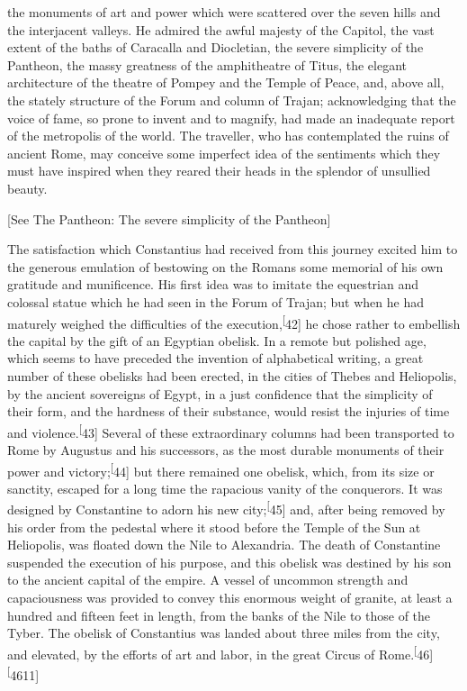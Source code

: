 the monuments of art and power which were scattered over the
seven hills and the interjacent valleys. He admired the awful
majesty of the Capitol, the vast extent of the baths of Caracalla
and Diocletian, the severe simplicity of the Pantheon, the massy
greatness of the amphitheatre of Titus, the elegant architecture
of the theatre of Pompey and the Temple of Peace, and, above all,
the stately structure of the Forum and column of Trajan;
acknowledging that the voice of fame, so prone to invent and to
magnify, had made an inadequate report of the metropolis of the
world. The traveller, who has contemplated the ruins of ancient
Rome, may conceive some imperfect idea of the sentiments which
they must have inspired when they reared their heads in the
splendor of unsullied beauty.

[See The Pantheon: The severe simplicity of the Pantheon]


The satisfaction which Constantius had received from this journey
excited him to the generous emulation of bestowing on the Romans
some memorial of his own gratitude and munificence. His first
idea was to imitate the equestrian and colossal statue which he
had seen in the Forum of Trajan; but when he had maturely weighed
the difficulties of the execution,\textsuperscript[42] he chose rather to
embellish the capital by the gift of an Egyptian obelisk. In a
remote but polished age, which seems to have preceded the
invention of alphabetical writing, a great number of these
obelisks had been erected, in the cities of Thebes and
Heliopolis, by the ancient sovereigns of Egypt, in a just
confidence that the simplicity of their form, and the hardness of
their substance, would resist the injuries of time and violence.\textsuperscript[43]
Several of these extraordinary columns had been transported to
Rome by Augustus and his successors, as the most durable
monuments of their power and victory;\textsuperscript[44] but there remained one
obelisk, which, from its size or sanctity, escaped for a long
time the rapacious vanity of the conquerors. It was designed by
Constantine to adorn his new city;\textsuperscript[45] and, after being removed by
his order from the pedestal where it stood before the Temple of
the Sun at Heliopolis, was floated down the Nile to Alexandria.
The death of Constantine suspended the execution of his purpose,
and this obelisk was destined by his son to the ancient capital
of the empire. A vessel of uncommon strength and capaciousness
was provided to convey this enormous weight of granite, at least
a hundred and fifteen feet in length, from the banks of the Nile
to those of the Tyber. The obelisk of Constantius was landed
about three miles from the city, and elevated, by the efforts of
art and labor, in the great Circus of Rome.\textsuperscript[46] \textsuperscript[4611]

